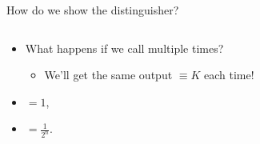 \documentclass[aspectratio=169, lualatex, handout]{beamer}
\begin{document}
\begin{frame}{How do we show the distinguisher?}
	\begin{columns}[c]
		\begin{column}{0.4\textwidth}
			\begin{itemize}
				\item What happens if we call \prog{}\link{} multiple times?
				      \begin{itemize}
					      \item We'll get the same output $\equiv K$ each time!
				      \end{itemize}
				\item {} $= 1$,
				\item {} $= \frac{1}{2^n}$.
			\end{itemize}
		\end{column}
		\begin{column}{0.6\textwidth}
			\begin{flushright}
			\end{flushright}
		\end{column}
	\end{columns}
\end{frame}
\end{document}
